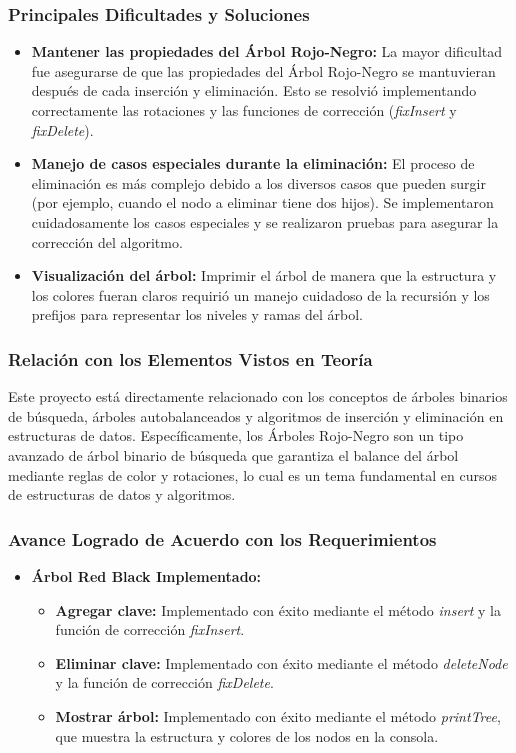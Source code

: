 \documentclass[12pt]{article}
\begin{document}
\subsubsection{Principales Dificultades y Soluciones}

\begin{itemize}
    \item \textbf{Mantener las propiedades del Árbol Rojo-Negro:} La mayor dificultad fue asegurarse de que las propiedades del Árbol Rojo-Negro se mantuvieran después de cada inserción y eliminación. Esto se resolvió implementando correctamente las rotaciones y las funciones de corrección (\textit{fixInsert} y \textit{fixDelete}).
    \item \textbf{Manejo de casos especiales durante la eliminación:} El proceso de eliminación es más complejo debido a los diversos casos que pueden surgir (por ejemplo, cuando el nodo a eliminar tiene dos hijos). Se implementaron cuidadosamente los casos especiales y se realizaron pruebas para asegurar la corrección del algoritmo.
    \item \textbf{Visualización del árbol:} Imprimir el árbol de manera que la estructura y los colores fueran claros requirió un manejo cuidadoso de la recursión y los prefijos para representar los niveles y ramas del árbol.
\end{itemize}

\subsubsection{Relación con los Elementos Vistos en Teoría}

Este proyecto está directamente relacionado con los conceptos de árboles binarios de búsqueda, árboles autobalanceados y algoritmos de inserción y eliminación en estructuras de datos. Específicamente, los Árboles Rojo-Negro son un tipo avanzado de árbol binario de búsqueda que garantiza el balance del árbol mediante reglas de color y rotaciones, lo cual es un tema fundamental en cursos de estructuras de datos y algoritmos.

\subsubsection{Avance Logrado de Acuerdo con los Requerimientos}

\begin{itemize}
    \item \textbf{Árbol Red Black Implementado:}
    \begin{itemize}
        \item \textbf{Agregar clave:} Implementado con éxito mediante el método \textit{insert} y la función de corrección \textit{fixInsert}.
        \item \textbf{Eliminar clave:} Implementado con éxito mediante el método \textit{deleteNode} y la función de corrección \textit{fixDelete}.
        \item \textbf{Mostrar árbol:} Implementado con éxito mediante el método \textit{printTree}, que muestra la estructura y colores de los nodos en la consola.
    \end{itemize}
\end{itemize}
\end{document}

